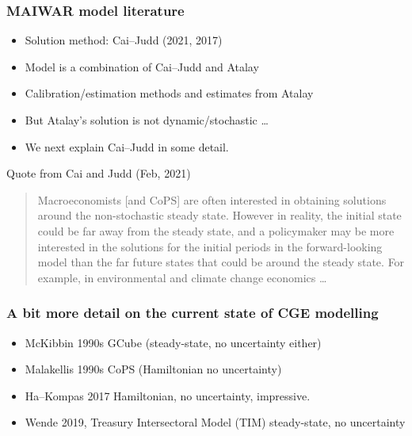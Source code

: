 \documentclass[handout,english]{beamer}
\begin{document}
\begin{frame}\thispagestyle{empty}
  \frametitle{MAIWAR model literature}
  \begin{itemize}
    \item Solution method: Cai--Judd (2021, 2017)
    \item Model is a combination of Cai--Judd and Atalay
    \item Calibration/estimation methods and estimates from Atalay
    \item But Atalay's solution is not dynamic/stochastic
      \dots
    \item We next explain Cai--Judd in some detail.
  \end{itemize}
\end{frame}
\begin{frame}
  {\color{blue} Quote from Cai and Judd (Feb, 2021)}
  \begin{quote}
  {\color{blue} Macroeconomists [and CoPS] are often interested in obtaining solutions around the non-stochastic steady state.}
  {\color{patrickcolor3} However in reality, the initial state could be far away from the steady state, and a policymaker may be more interested in the solutions for the initial periods in the forward-looking model than the far future states that could be around the steady state.}
  {\color{patrickcolor1} For example, in environmental and climate change economics \dots}
\end{quote}
\end{frame}
\begin{frame}
  \frametitle{A bit more detail on the current state of CGE modelling}
  \begin{itemize}
      \item McKibbin 1990s GCube (steady-state, no uncertainty either)
      \item Malakellis 1990s CoPS (Hamiltonian no uncertainty)
      \item Ha--Kompas 2017 Hamiltonian, no uncertainty, impressive.
      \item Wende 2019, Treasury Intersectoral Model (TIM) steady-state,
        no uncertainty
  \end{itemize}
\end{frame}
\end{document}
